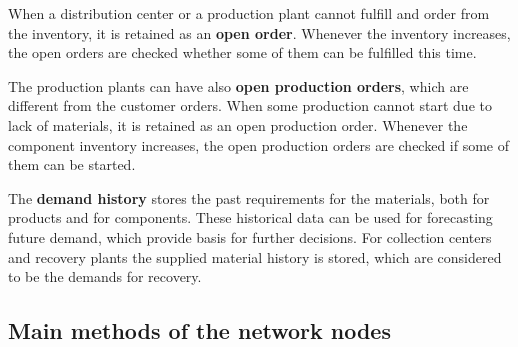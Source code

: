 \documentclass{article}
\begin{document}
When a distribution center or a production plant cannot fulfill and order from the inventory, it is retained as an \textbf{open order}. Whenever the inventory increases, the open orders are checked whether some of them can be fulfilled this time.

The production plants can have also \textbf{open production orders}, which are different from the customer orders. When some production cannot start due to lack of materials, it is retained as an open production order. Whenever the component inventory increases, the open production orders are checked if some of them can be started.

The \textbf{demand history} stores the past requirements for the materials, both for products and for components. These historical data can be used for forecasting future demand, which provide basis for further decisions. For collection centers and recovery plants the supplied material history is stored, which are considered to be the demands for recovery.


\subsection{Main methods of the network nodes}
\end{document}
